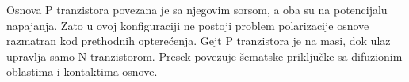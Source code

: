 Osnova P tranzistora povezana je sa njegovim sorsom, a oba su na potencijalu napajanja. Zato u ovoj konfiguraciji ne postoji problem polarizacije osnove razmatran kod prethodnih opterećenja. Gejt P tranzistora je na masi, dok ulaz upravlja samo N tranzistorom. Presek povezuje šematske priključke sa difuzionim oblastima i kontaktima osnove.
